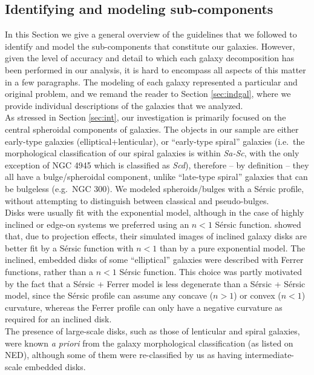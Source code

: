 \documentclass[preprint2]{emulateapj}
\begin{document}
\subsection{Identifying and modeling sub-components}
\label{sec:cpts}
In this Section we give a general overview of the guidelines that we followed to identify and model 
the sub-components that constitute our galaxies. 
However, given the level of accuracy and detail to which each galaxy decomposition has been performed in our analysis,
it is hard to encompass all aspects of this matter in a few paragraphs.
The modeling of each galaxy represented a particular and original problem, 
and we remand the reader to Section \ref{sec:indgal},
where we provide individual descriptions of the galaxies that we analyzed. \\
As stressed in Section \ref{sec:int}, our investigation is primarily focused on the central spheroidal components 
of galaxies. 
The objects in our sample are either early-type galaxies (elliptical+lenticular), 
or ``early-type spiral'' galaxies 
(i.e.~the morphological classification of our spiral galaxies is within \emph{Sa-Sc}, 
with the only exception of NGC 4945 which is classified as \emph{Scd}), 
therefore -- by definition -- they all have a bulge/spheroidal component, 
unlike ``late-type spiral'' galaxies that can be bulgeless (e.g.~NGC 300).   
We modeled spheroids/bulges with a S\'ersic profile, without attempting to distinguish between classical and pseudo-bulges.  \\
Disks were usually fit with the exponential model, 
although in the case of highly inclined or edge-on systems we preferred using an $n < 1$ S\'ersic function. 
\citet{pastrav2013a,pastrav2013b} showed that, due to projection effects, their simulated images of inclined galaxy disks 
are better fit by a S\'ersic function with $n < 1$ than by a pure exponential model.
The inclined, embedded disks of some ``elliptical'' galaxies were described with Ferrer functions, rather than a $n < 1$ S\'ersic function. 
This choice was partly motivated by the fact that a S\'ersic + Ferrer model is less degenerate than a S\'ersic + S\'ersic model, 
since the S\'ersic profile can assume any concave ($n > 1$) or convex ($n < 1$) curvature, 
whereas the Ferrer profile can only have a negative curvature as required for an inclined disk. \\
The presence of large-scale disks, such as those of lenticular and spiral galaxies, 
were known \emph{a priori} from the galaxy morphological classification (as listed on NED), 
although some of them were re-classified by us as having intermediate-scale embedded disks.
\end{document}

